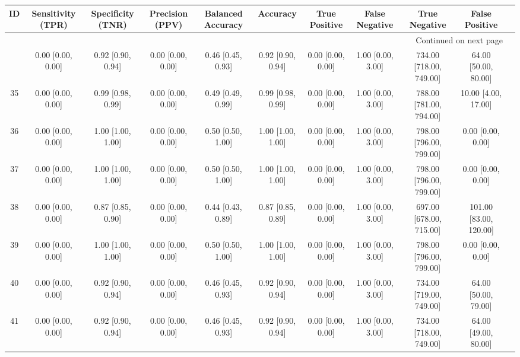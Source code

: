 \documentclass[8pt]{article}
\begin{document}
\begin{center}
\begin{footnotesize}
\begin{longtable}{|ccccccccccc|}
\toprule
 ID &  Sensitivity (TPR) &  Specificity (TNR) &    Precision (PPV) &  Balanced Accuracy &           Accuracy &      True Positive &     False Negative &            True Negative &          False Positive \\
\midrule
\endhead
\midrule
\multicolumn{10}{r}{{Continued on next page}} \\
\midrule
\endfoot

\bottomrule
\endlastfoot
 33 &  0.00 [0.00, 0.00] &  0.92 [0.90, 0.94] &  0.00 [0.00, 0.00] &  0.46 [0.45, 0.93] &  0.92 [0.90, 0.94] &  0.00 [0.00, 0.00] &  1.00 [0.00, 3.00] &  734.00 [718.00, 749.00] &    64.00 [50.00, 80.00] \\
 35 &  0.00 [0.00, 0.00] &  0.99 [0.98, 0.99] &  0.00 [0.00, 0.00] &  0.49 [0.49, 0.99] &  0.99 [0.98, 0.99] &  0.00 [0.00, 0.00] &  1.00 [0.00, 3.00] &  788.00 [781.00, 794.00] &     10.00 [4.00, 17.00] \\
 36 &  0.00 [0.00, 0.00] &  1.00 [1.00, 1.00] &  0.00 [0.00, 0.00] &  0.50 [0.50, 1.00] &  1.00 [1.00, 1.00] &  0.00 [0.00, 0.00] &  1.00 [0.00, 3.00] &  798.00 [796.00, 799.00] &       0.00 [0.00, 0.00] \\
 37 &  0.00 [0.00, 0.00] &  1.00 [1.00, 1.00] &  0.00 [0.00, 0.00] &  0.50 [0.50, 1.00] &  1.00 [1.00, 1.00] &  0.00 [0.00, 0.00] &  1.00 [0.00, 3.00] &  798.00 [796.00, 799.00] &       0.00 [0.00, 0.00] \\
 38 &  0.00 [0.00, 0.00] &  0.87 [0.85, 0.90] &  0.00 [0.00, 0.00] &  0.44 [0.43, 0.89] &  0.87 [0.85, 0.89] &  0.00 [0.00, 0.00] &  1.00 [0.00, 3.00] &  697.00 [678.00, 715.00] &  101.00 [83.00, 120.00] \\
 39 &  0.00 [0.00, 0.00] &  1.00 [1.00, 1.00] &  0.00 [0.00, 0.00] &  0.50 [0.50, 1.00] &  1.00 [1.00, 1.00] &  0.00 [0.00, 0.00] &  1.00 [0.00, 3.00] &  798.00 [796.00, 799.00] &       0.00 [0.00, 0.00] \\
 40 &  0.00 [0.00, 0.00] &  0.92 [0.90, 0.94] &  0.00 [0.00, 0.00] &  0.46 [0.45, 0.93] &  0.92 [0.90, 0.94] &  0.00 [0.00, 0.00] &  1.00 [0.00, 3.00] &  734.00 [719.00, 749.00] &    64.00 [50.00, 79.00] \\
 41 &  0.00 [0.00, 0.00] &  0.92 [0.90, 0.94] &  0.00 [0.00, 0.00] &  0.46 [0.45, 0.93] &  0.92 [0.90, 0.94] &  0.00 [0.00, 0.00] &  1.00 [0.00, 3.00] &  734.00 [718.00, 749.00] &    64.00 [49.00, 80.00] \\

\end{longtable}
\end{footnotesize}
\end{center}
\end{document}
